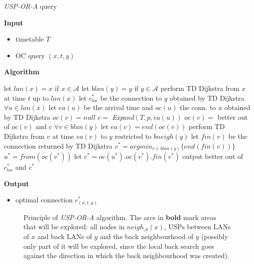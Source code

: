 	\color{algcolor}
	\begin{algorithm}[H]
		\color{inalgcolor}
		\caption{\textit{USP-OR-A} query}
		\label{alg:uspora-query}
		\textbf{Input} 
		\begin{itemize}
			\item timetable $T$
			\item OC query $(x, t, y)$
		\end{itemize}
		\textbf{Algorithm}
		\begin{algorithmic}
			\STATE let $lan(x) = x$ if $x \in \mathcal{A}$
			\STATE let $blan(y) = y$ if $y \in \mathcal{A}$
			\STATE {}
			\STATE perform TD Dijkstra from $x$ at time $t$ up to $lan(x)$
				\STATE let $c_{loc}^{*}$ be the connection to $y$ obtained by TD Dijkstra 
			\ENDIF
			\STATE $\forall u \in lan(x)$ let $ea(u)$ be the arrival time and $oc(u)$ the conn. to $u$ obtained by TD Dijkstra
			\STATE {}
				\STATE $oc(v) = null$
						\STATE $c =$ \textit{Expand}$(T, p, ea(u))$
						\STATE $oc(v) =$ better out of $oc(v)$ and $c$
					\ENDFOR
				\ENDFOR
			\ENDFOR
			\STATE $\forall v \in blan(y)$ let $ea(v) = end(oc(v))$
			\STATE {}
				\STATE perform TD Dijkstra from $v$ at time $ea(v)$ to $y$ restricted to $bneigh(y)$
				\STATE let $fin(v)$ be the connection returned by TD Dijkstra
			\ENDFOR
			\STATE $v^{*} = argmin_{v \in blan(y)} \{end(fin(v))\}$
			\STATE $u^{*} = from(oc(v^{*}))$
			\STATE let $c^{*} = oc(u^{*}) . oc(v^{*}) . fin(v^{*})$ 
			\STATE output better out of $c_{loc}^{*}$ and $c^{*}$
		\end{algorithmic}
		\textbf{Output}
		\begin{itemize}
			\item optimal connection $c_{(x, t, y)}^{*}$
		\end{itemize}
	\end{algorithm}
	\color{black}
	
	\begin{figure}[h!]
		\begin{center}
		\end{center}
		\caption{\label{fig:uspora} Principle of \textit{USP-OR-A} algorithm. The arcs in \textbf{bold} mark areas that will be explored: all nodes in $neigh_{\mathcal{A}}(x)$, USPs between LANs of $x$ and back LANs of $y$ and the back neighbourhood of $y$ (possibly only part of it will be explored, since the local back search goes against the direction in which the back neighbourhood was created).}
	\end{figure}
	
